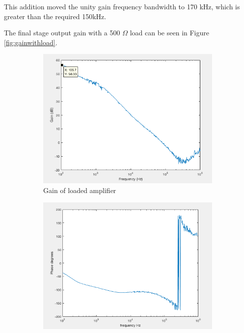 	This addition moved the unity gain frequency bandwidth to 170 kHz, which is greater than the required 150kHz.
		
		
		
		
		
		
		
		
		
		
		
		
		
		
		
		
		
		 The final stage output gain with a 500 $\Omega$ load can be seen in Figure \ref{fig:gainwithload}.
				
		
	
	
	\begin{figure}[H]
		\centering
		\begin{subfigure}[b]{0.45\textwidth}
			\centering
			\includegraphics[scale=.40]{ExperimentalImplementation/gainwithload.png}
		\caption{Gain of loaded amplifier}
		\label{fig:tload}
		\end{subfigure}
		\hfill
		\begin{subfigure}[b]{0.45\textwidth}
			\centering
			\includegraphics[scale=.40]{ExperimentalImplementation/phasewithload.png}

\end{subfigure}
\end{figure}
